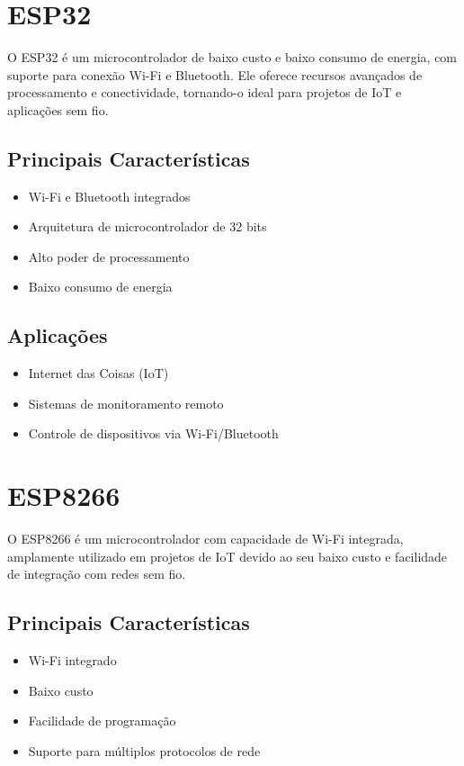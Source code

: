 \documentclass{ufersa}
\begin{document}
\maketitle

\section{ESP32}
O ESP32 é um microcontrolador de baixo custo e baixo consumo de energia, com suporte para conexão Wi-Fi e Bluetooth. Ele oferece recursos avançados de processamento e conectividade, tornando-o ideal para projetos de IoT e aplicações sem fio.

\subsection{Principais Características}
\begin{itemize}
    \item Wi-Fi e Bluetooth integrados
    \item Arquitetura de microcontrolador de 32 bits
    \item Alto poder de processamento
    \item Baixo consumo de energia
\end{itemize}

\subsection{Aplicações}
\begin{itemize}
    \item Internet das Coisas (IoT)
    \item Sistemas de monitoramento remoto
    \item Controle de dispositivos via Wi-Fi/Bluetooth
\end{itemize}

\section{ESP8266}
O ESP8266 é um microcontrolador com capacidade de Wi-Fi integrada, amplamente utilizado em projetos de IoT devido ao seu baixo custo e facilidade de integração com redes sem fio.

\subsection{Principais Características}
\begin{itemize}
    \item Wi-Fi integrado
    \item Baixo custo
    \item Facilidade de programação
    \item Suporte para múltiplos protocolos de rede
\end{itemize}
\end{document}
